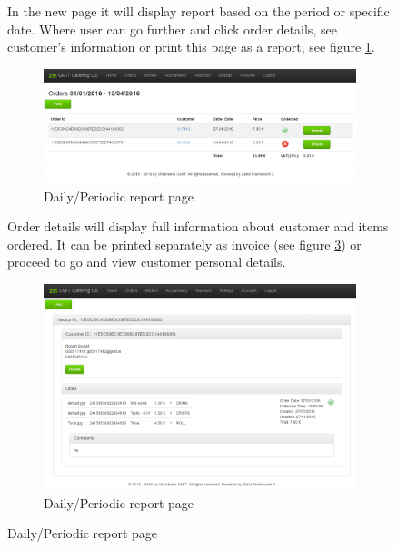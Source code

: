 \begin{figure}
			In the new page it will display report based on the period or specific date. Where user can go further and click order details, see customer's information or print this page as a report, see figure \ref{fig:daily-report-page}.
			
			\begin{figure}[H]
				\centering
				\includegraphics[width=1\textwidth]{img/zf2/01-canteen_select_periodic_report_page_1.png}
				\caption{Daily/Periodic report page}
				\label{fig:daily-report-page}
			\end{figure}
			
			Order details will display full information about customer and items ordered. It can be printed separately as invoice (see figure \ref{fig:order-invoice-page}) or proceed to go and view customer personal details.
			
			\begin{figure}[H]
				\centering
				\includegraphics[width=1\textwidth]{img/zf2/01-canteen_select_periodic_report_page_2.png}
				\caption{Daily/Periodic report page}
				\label{fig:order-invoice-page}
			\end{figure}
			
			
		
		
		

\end{figure}
